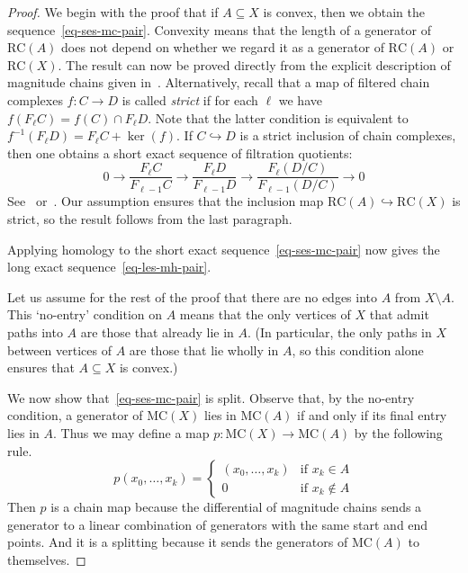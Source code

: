 \documentclass[a4paper, 11 pt, oneside, reqno]{amsart}
\numberwithin{lemma}{section}
\theoremstyle{definition}
\newcommand{\RC}{\mathrm{RC}}
\newcommand{\MC}{\mathrm{MC}}
\begin{document}
\begin{proof}
    We begin with the proof that if $A\subseteq X$ is convex,
    then we obtain the sequence~\eqref{eq-ses-mc-pair}.
    Convexity means that the length of a generator 
    of $\RC(A)$ does not depend on whether we regard it
    as a generator of $\RC(A)$ or $\RC(X)$.
    The result can now be proved directly from the 
    explicit description of magnitude chains given
    in~.
    Alternatively, recall that a map of filtered chain complexes
    $f\colon C\to D$ is called \emph{strict}
    if for each $\ell$ we have 
    $f(F_\ell C) = f(C)\cap F_\ell D$.
    Note that the latter condition is equivalent to
    $f^{-1}(F_\ell D) = F_\ell C + \ker(f)$.
    If $C\hookrightarrow D$ is a strict inclusion of 
    chain complexes, then one obtains a short
    exact sequence of filtration quotients:
    \[
        0
        \to
        \frac{F_\ell C }
        {F_{\ell-1} C }
        \to
        \frac{F_\ell D }
        {F_{\ell-1} D }
        \to
       \frac{ F_\ell\left(
             D / C 
        \right)}
        { F_{\ell-1}\left(
             D / C 
        \right)}
        \to
        0
    \]
    See~\cite[Section 0120]{Stacks} or~\cite[Lemme~1.1.9]{Deligne}.
    Our assumption ensures that the 
    inclusion map $\RC(A)\hookrightarrow \RC(X)$ is strict, 
    so the result follows from the last paragraph.

    Applying homology to the short exact 
    sequence~\eqref{eq-ses-mc-pair} now gives the long exact
    sequence~\eqref{eq-les-mh-pair}.

    Let us assume for the rest of the proof that
    there are no edges into $A$ from $X\setminus A$.
    This `no-entry' condition on $A$ means that the only vertices
    of $X$ that admit paths into $A$ are those that already lie in
    $A$.
    (In particular, the only paths in $X$ between vertices of $A$
    are those that lie wholly in $A$, so this condition alone ensures that 
    $A\subseteq X$ is convex.)
    
    We now show that~\eqref{eq-ses-mc-pair} is split.
    Observe that, by the no-entry condition, a generator of
    $\MC(X)$ lies in $\MC(A)$ if and only if its final entry 
    lies in $A$.
    Thus we may define a map $p\colon \MC(X)\to\MC(A)$ by 
    the following rule.
    \[
        p(x_0,\ldots,x_k)
        =
        \begin{cases}
            (x_0,\ldots,x_k) & \text{if }x_k\in A
            \\
            0 & \text{if }x_k\not\in A
        \end{cases}
    \]
    Then $p$ is a chain map because the differential of magnitude 
    chains sends a generator to a linear combination of generators
    with the same start and end points.
    And it is a splitting because it sends the 
    generators of $\MC(A)$ to themselves.


\end{proof}
\end{document}
